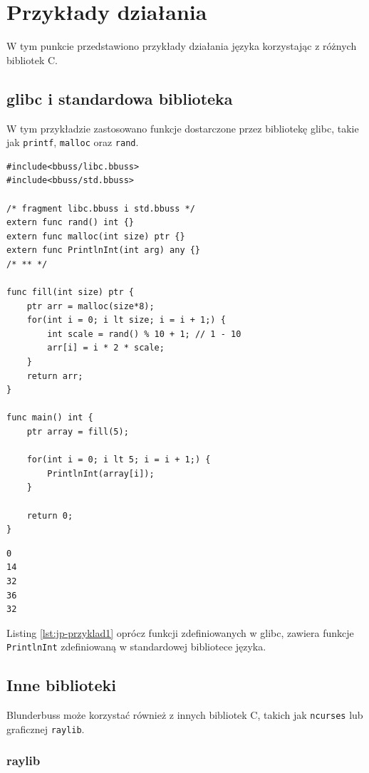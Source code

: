 \section{Przykłady działania}

W tym punkcie przedstawiono przykłady działania języka korzystając z różnych bibliotek C.

\subsection{glibc i standardowa biblioteka}

W tym przykładzie zastosowano funkcje dostarczone przez bibliotekę glibc, takie jak \verb|printf|, \verb|malloc| oraz \verb|rand|.

\newpage
\begin{lstlisting}[caption={Przykład działania glibc}, morekeywords={func, lt, ptr, any}, label={lst:jp-przyklad1}]
#include<bbuss/libc.bbuss>
#include<bbuss/std.bbuss>

/* fragment libc.bbuss i std.bbuss */
extern func rand() int {}
extern func malloc(int size) ptr {}
extern func PrintlnInt(int arg) any {}
/* ** */

func fill(int size) ptr {
    ptr arr = malloc(size*8);
    for(int i = 0; i lt size; i = i + 1;) {
        int scale = rand() % 10 + 1; // 1 - 10
        arr[i] = i * 2 * scale;
    }
    return arr;
}

func main() int {
    ptr array = fill(5);

    for(int i = 0; i lt 5; i = i + 1;) {
        PrintlnInt(array[i]);
    }

    return 0;
}
\end{lstlisting}

\begin{lstlisting}[caption={Wynik przykładu \ref{lst:jp-przyklad1}}]
0
14
32
36
32
\end{lstlisting}

Listing \ref{lst:jp-przyklad1} oprócz funkcji zdefiniowanych w glibc, zawiera funkcje \verb|PrintlnInt| zdefiniowaną w standardowej bibliotece języka.

\subsection{Inne biblioteki}

Blunderbuss może korzystać również z innych bibliotek C, takich jak \verb|ncurses| lub graficznej \verb|raylib|.

\subsubsection{raylib}

